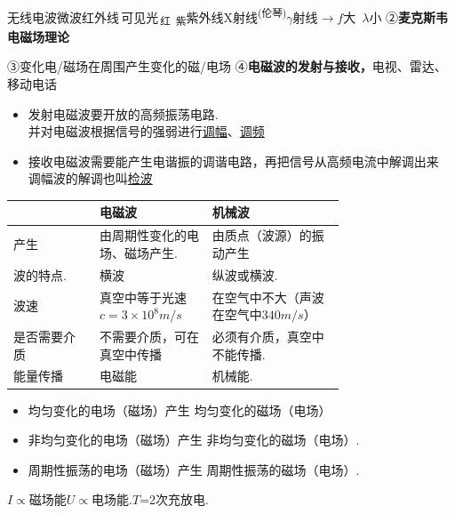 \noindent 无线电波\quad 微波\quad 红外线\,可见光\textsubscript{\,红\ 紫}\quad 紫外线\quad X射线\textsuperscript{(伦琴)}\quad $\gamma$射线\quad $\longrightarrow$\quad $f$大\ $\lambda$小 %
②\quad \textbf{麦克斯韦电磁场理论}

③\quad 变化电/磁场在周围产生变化的磁/电场 %
④\quad \textbf{电磁波的发射与接收，}\quad 电视、雷达、移动电话
\begin{itemize}
\item 发射电磁波要开放的高频振荡电路.\\ 并对电磁波根据信号的强弱进行\underline{调幅}、\underline{调频} %
\item 接收电磁波需要能产生电谐振的调谐电路，再把信号从高频电流中解调出来\\ 调幅波的解调也叫\underline{检波} %
\end{itemize}
\begin{center}
\begin{tabular}{@{}lp{0.34\linewidth}p{0.4\linewidth}@{}}
\toprule
 & 电磁波 & 机械波 \\
\midrule
产生 & 由周期性变化的电场、磁场产生. & 由质点（波源）的振动产生 \\
波的特点. & 横波 & 纵波或横波. \\
波速 & 真空中等于光速$c=3\times10^{8}\unit{m/s}$ & 在空气中不大（声波在空气中$340\unit{m/s}$） \\
是否需要介质 & 不需要介质，可在真空中传播 & 必须有介质，真空中不能传播. \\
能量传播 & 电磁能 & 机械能. \\
\bottomrule
\end{tabular}
\end{center}
\begin{itemize}
\item 均匀变化的电场（磁场）产生 均匀变化的磁场（电场） %
\item 非均匀变化的电场（磁场）产生 非均匀变化的磁场（电场）.
\item 周期性振荡的电场（磁场）产生 周期性振荡的磁场（电场）.
\end{itemize}
$I\propto$磁场能\qquad $U\propto$电场能.\qquad $T$=2次充放电.

